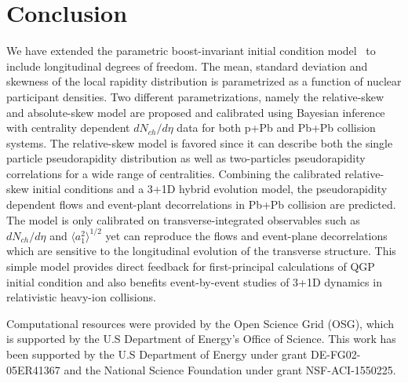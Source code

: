 \documentclass[3p,times,twocolumn]{elsarticle}
\begin{document}
\section{Conclusion}
\label{Conclusion}
We have extended the parametric boost-invariant initial condition model \trento~to include longitudinal degrees of freedom.
The mean, standard deviation and skewness of the local rapidity distribution is parametrized as a function of nuclear participant densities.
Two different parametrizations, namely the relative-skew and absolute-skew model are proposed and calibrated using Bayesian inference with centrality dependent $dN_{ch}/d\eta$ data for both p+Pb and Pb+Pb collision systems.
The relative-skew model is favored since it can describe both the single particle pseudorapidity distribution as well as two-particles pseudorapidity correlations for a wide range of centralities.
Combining the calibrated relative-skew initial conditions and a 3+1D hybrid evolution model, the pseudorapidity dependent flows and event-plant decorrelations in Pb+Pb collision are predicted.
The model is only calibrated on transverse-integrated observables such as $dN_{ch}/d\eta$ and $\langle a_1^2\rangle^{1/2}$ yet can reproduce the flows and event-plane decorrelations which are sensitive to the longitudinal evolution of the transverse structure.
This simple model provides direct feedback for first-principal calculations of QGP initial condition and also benefits event-by-event studies of 3+1D dynamics in relativistic heavy-ion collisions. 

Computational resources were provided by the Open Science Grid (OSG), which is supported by the U.S Department of Energy's Office of Science. This work has been supported by the U.S Department of Energy under grant DE-FG02-05ER41367 and the National Science Foundation under grant NSF-ACI-1550225.












\end{document}
